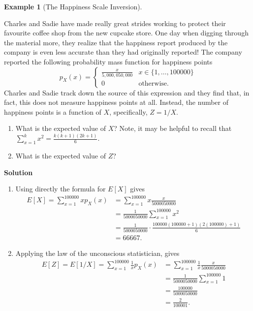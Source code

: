 \documentclass[
  letterpaper,
  DIV=11,
  numbers=noendperiod]{scrreprt}
\providecommand{\tightlist}{%
  \setlength{\itemsep}{0pt}\setlength{\parskip}{0pt}}\usepackage{longtable,booktabs,array}
\theoremstyle{definition}
\theoremstyle{definition}
\newtheorem{example}{Example}[chapter]
\theoremstyle{definition}
\theoremstyle{remark}
\begin{document}
\begin{example}[The Happiness Scale
Inversion]\protect\hypertarget{exm-expected-value-transformation}{}\label{exm-expected-value-transformation}

Charles and Sadie have made really great strides working to protect
their favourite coffee shop from the new cupcake store. One day when
digging through the material more, they realize that the happiness
report produced by the company is even less accurate than they had
originally reported! The company reported the following probability mass
function for happiness points \[
p_X(x) = \begin{cases}
    \frac{x}{5,000,050,000} & x \in \{1,\dots,100 000\} \\
    0 & \text{otherwise}.
\end{cases}\] Charles and Sadie track down the source of this expression
and they find that, in fact, this does not measure happiness points at
all. Instead, the number of happiness points is a function of \(X\),
specifically, \(Z = 1/X\).

\begin{enumerate}
\def\labelenumi{\alph{enumi}.}
\tightlist
\item
  What is the expected value of \(X\)? Note, it may be helpful to recall
  that \(\sum_{x=1}^{k} x^2 = \frac{k(k+1)(2k+1)}{6}\).
\item
  What is the expected value of \(Z\)?
\end{enumerate}

\begin{tcolorbox}[enhanced jigsaw, colback=white, colframe=quarto-callout-color-frame, arc=.35mm, leftrule=.75mm, rightrule=.15mm, opacityback=0, breakable, bottomrule=.15mm, left=2mm, toprule=.15mm]

\vspace{-3mm}\textbf{Solution}\vspace{3mm}

\begin{enumerate}
\def\labelenumi{\alph{enumi}.}
\item
  Using directly the formula for \(E[X]\) gives \begin{align*}
  E[X] = \sum_{x=1}^{100000} xp_X(x) &= \sum_{x=1}^{100000} x\frac{x}{5000050000} \\
  &= \frac{1}{5000050000}\sum_{x=1}^{100000}x^2 \\
  &= \frac{1}{5000050000}\cdot\frac{100000(100000+1)(2(100000)+1)}{6} \\
  &= 66 667.
  \end{align*}
\item
  Applying the law of the unconscious statistician, gives \begin{align*}
  E[Z] = E[1/X] = \sum_{x=1}^{100000} \frac{1}{x}p_X(x) &= \sum_{x=1}^{100000} \frac{1}{x}\frac{x}{5000050000} \\
  &= \frac{1}{5000050000}\sum_{x=1}^{100000} 1 \\
  &= \frac{100000}{5000050000} \\
  &= \frac{2}{100001}.
  \end{align*}
\end{enumerate}


\end{tcolorbox}
\end{example}
\end{document}
